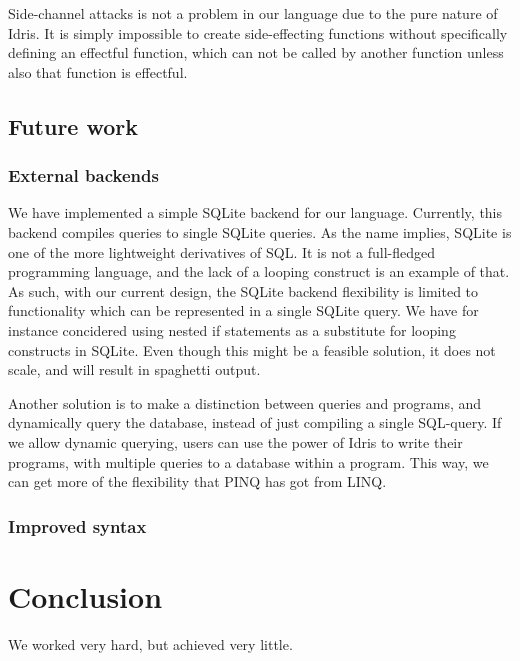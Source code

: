 \documentclass[12pt]{article}
\begin{document}
Side-channel attacks is not a problem in our language due to the pure nature of Idris.
It is simply impossible to create side-effecting functions without specifically defining an effectful function, which can not be called by another function unless also that function is effectful.

\subsection{Future work}\label{sec:future_work}

\subsubsection{External backends}

We have implemented a simple SQLite backend for our language. 
Currently, this backend compiles queries to single SQLite queries.
As the name implies, SQLite is one of the more lightweight derivatives of SQL.
It is not a full-fledged programming language, and the lack of a looping construct is an example of that.
As such, with our current design, the SQLite backend flexibility is limited to functionality which can be represented in a single SQLite query.
We have for instance concidered using nested if statements as a substitute for looping constructs in SQLite.
Even though this might be a feasible solution, it does not scale, and will result in spaghetti output.

Another solution is to make a distinction between queries and programs, and dynamically query the database, instead of just compiling a single SQL-query.
If we allow dynamic querying, users can use the power of Idris to write their programs, with multiple queries to a database within a program.
This way, we can get more of the flexibility that PINQ has got from LINQ. 

\subsubsection{Improved syntax}





\section{Conclusion}\label{sec:conclusion}

We worked very hard, but achieved very little.



\end{document}
